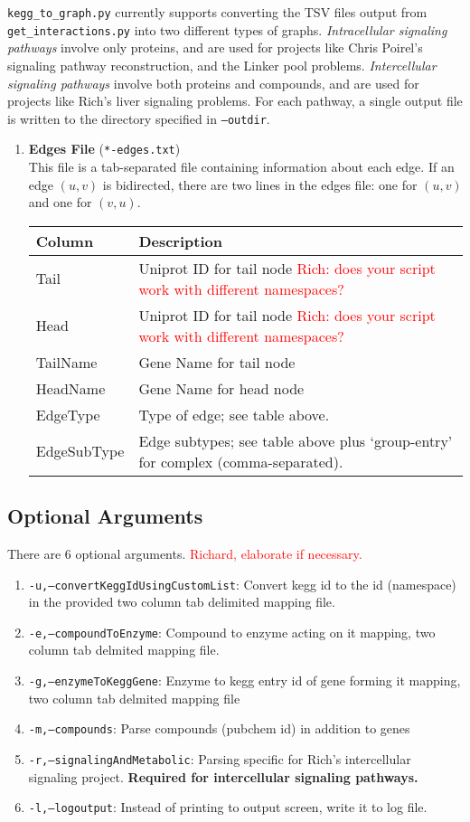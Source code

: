 \documentclass[10pt]{article}
\newcommand{\getinteractions}{\texttt{get\_interactions.py} }
\newcommand{\keggtograph}{\texttt{kegg\_to\_graph.py} }
\begin{document}
\keggtograph currently supports converting the TSV files output from \getinteractions into two different types of graphs.  \emph{Intracellular signaling pathways} involve only proteins, and are used for projects like Chris Poirel's signaling pathway reconstruction, and the Linker pool problems.  \emph{Intercellular signaling pathways} involve both proteins and compounds, and are used for projects like Rich's liver signaling problems.  For each pathway, a single output file is written to the directory specified in \texttt{--outdir}.
\begin{enumerate}
\item \textbf{Edges File} (\texttt{*-edges.txt})\\
This file is a tab-separated file containing information about each edge.  If an edge $(u,v)$ is bidirected, there are two lines in the edges file: one for $(u,v)$ and one for $(v,u)$.
\begin{center}
\begin{tabular}{l|l}
\textbf{Column} & \textbf{Description} \\ \hline
Tail & Uniprot ID for tail node \textcolor{red}{Rich: does your script work with different namespaces?}\\
Head & Uniprot ID for tail node \textcolor{red}{Rich: does your script work with different namespaces?}\\
TailName & Gene Name for tail node\\
HeadName & Gene Name for head node\\
EdgeType & Type of edge; see table above.\\
EdgeSubType & Edge subtypes; see table above plus `group-entry' for complex (comma-separated).
\end{tabular}
\end{center}
\end{enumerate}

\subsection{Optional Arguments}
There are 6 optional arguments. \textcolor{red}{Richard, elaborate if necessary.}
\begin{enumerate}
\item \texttt{-u,--convertKeggIdUsingCustomList}: Convert kegg id to the id (namespace) in the provided two column tab delimited mapping file.
\item \texttt{-e,--compoundToEnzyme}: Compound to enzyme acting on it mapping, two column tab delmited mapping file.
\item \texttt{-g,--enzymeToKeggGene}: Enzyme to kegg entry id of gene forming it mapping, two column tab delmited mapping file
\item \texttt{-m,--compounds}: Parse compounds (pubchem id) in addition to genes
\item \texttt{-r,--signalingAndMetabolic}: Parsing specific for Rich's intercellular signaling project. \textbf{Required for intercellular signaling pathways.}
\item \texttt{-l,--logoutput}: Instead of printing to output screen, write it to log file.
\end{enumerate}
\end{document}
